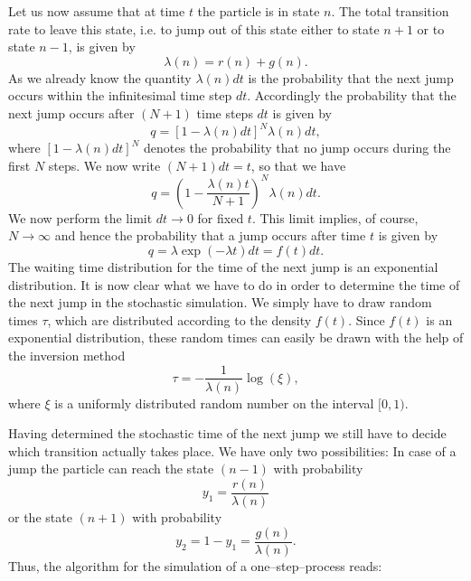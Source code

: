 Let us now assume that at time $t$ the particle is in state
$n$. The total transition rate to leave this state, i.e. to jump 
out of this state either to state $n+1$ or to state $n-1$, is 
given by
\begin{equation}
\label{TOTAL_RATE_ONE_JUMP}
\lambda(n) = r(n) + g(n).
\end{equation}
As we already know  the quantity $\lambda(n) dt$ is the 
probability that the next jump occurs within the infinitesimal 
time step $dt$. Accordingly the probability that the next jump 
occurs after $(N+1)$ time steps $dt$ is given by
\begin{equation*}
q=[1-\lambda(n)dt]^N \lambda(n)dt,
\end{equation*}
where $[1-\lambda(n)dt]^N$ denotes the probability that no jump
occurs during the first $N$ steps. We now write $(N+1)dt =t$, so 
that we have
\begin{equation*}
q= \left( 1 - \frac{\lambda(n) t}{N+1}\right)^N \lambda(n) dt.
\end{equation*}
We now perform the limit $dt \rightarrow 0$ for fixed $t$. This 
limit implies, of course, $N \rightarrow \infty$ and hence the 
probability that a jump occurs after time $t$ is given by
\begin{equation*}
q= \lambda \exp(-\lambda t) dt = f(t) dt.
\end{equation*}
The waiting time distribution for the time of the next jump is an
exponential distribution.
It is now clear what we have to do in order to determine the time 
of the next jump in the stochastic simulation.  
We simply have to draw random times $\tau$, 
which are distributed according to the density $f(t)$. Since $f(t)$
is an exponential distribution, these random times can easily be 
drawn with the help of the inversion method
\begin{equation}
\label{TAU_ONE_STEP}
\tau = - \frac{1}{\lambda(n)} \log(\xi),
\end{equation}
where $\xi$ is a uniformly distributed random number on the 
interval $[0,1)$. 

Having determined the stochastic time of the
next jump we still have to decide which transition actually takes 
place. We have only two possibilities: In case of a jump the 
particle can reach the state $(n-1)$ with probability
\begin{equation*}
y_1 = \frac{r(n)}{\lambda(n)}
\end{equation*}
or the state  $(n+1)$ with probability
\begin{equation}
y_2 = 1 -y_1 = \frac{g(n)}{\lambda(n)}.
\end{equation}
Thus, the algorithm for the simulation of a one--step--process
reads: \\

